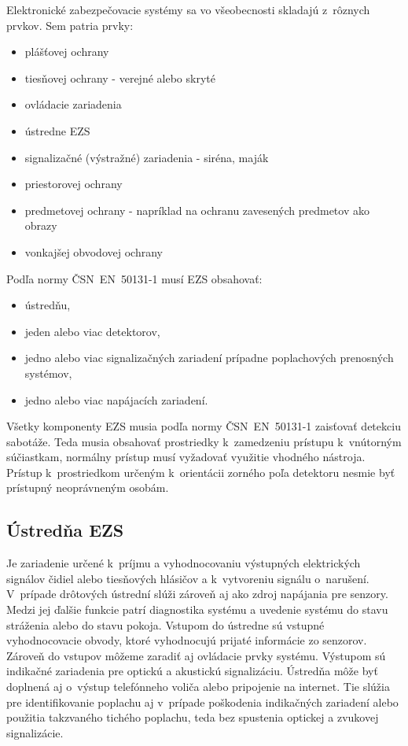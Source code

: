 Elektronické zabezpečovacie systémy sa vo všeobecnosti skladajú z~rôznych prvkov. Sem patria prvky:\cite{velas_ezs}
\begin{itemize}
    \item plášťovej ochrany
    \item tiesňovej ochrany - verejné alebo skryté
    \item ovládacie zariadenia
    \item ústredne EZS
    \item signalizačné (výstražné) zariadenia - siréna, maják
    \item priestorovej ochrany
    \item predmetovej ochrany - napríklad na ochranu zavesených predmetov ako obrazy
    \item vonkajšej obvodovej ochrany
\end{itemize}
Podľa normy ČSN~EN~50131-1 musí EZS obsahovať:
\begin{itemize}
    \item ústredňu, 
    \item jeden alebo viac detektorov,
    \item jedno alebo viac signalizačných zariadení prípadne poplachových prenosných systémov,
    \item jedno alebo viac napájacích zariadení. 
\end{itemize}

Všetky komponenty EZS musia podľa normy ČSN~EN~50131-1 zaisťovať detekciu sabotáže. Teda musia obsahovať prostriedky k~zamedzeniu prístupu k~vnútorným súčiastkam, normálny prístup musí vyžadovať využitie vhodného nástroja. Prístup k~prostriedkom určeným k~orientácii zorného poľa detektoru nesmie byť prístupný neoprávneným osobám.\cite{csn-en-50131-1}

\subsection{Ústredňa EZS}

Je zariadenie určené k~príjmu a vyhodnocovaniu výstupných elektrických signálov čidiel alebo tiesňových hlásičov a k~vytvoreniu signálu o~narušení. V~prípade drôtových ústrední slúži zároveň aj ako zdroj napájania pre senzory. Medzi jej ďalšie funkcie patrí diagnostika systému a uvedenie systému do stavu stráženia alebo do stavu pokoja. Vstupom do ústredne sú vstupné vyhodnocovacie obvody, ktoré vyhodnocujú prijaté informácie zo senzorov. Zároveň do vstupov môžeme zaradiť aj ovládacie prvky systému. Výstupom sú indikačné zariadenia pre optickú a akustickú signalizáciu. Ústredňa môže byť doplnená aj o~výstup telefónneho voliča alebo pripojenie na internet. Tie slúžia pre identifikovanie poplachu aj v~prípade poškodenia indikačných zariadení alebo použitia takzvaného tichého poplachu, teda bez spustenia optickej a zvukovej signalizácie.

